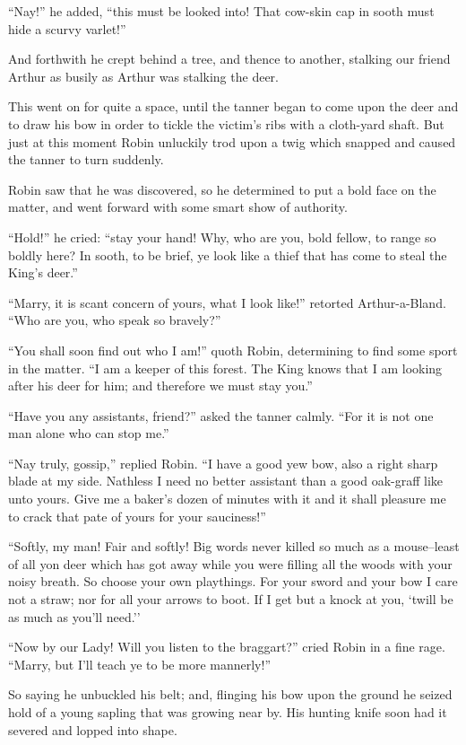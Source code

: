 ``Nay!'' he added, ``this must be looked into! That cow-skin cap in
sooth must hide a scurvy varlet!''

And forthwith he crept behind a tree, and thence to another, stalking
our friend Arthur as busily as Arthur was stalking the deer.

This went on for quite a space, until the tanner began to come upon the
deer and to draw his bow in order to tickle the victim's ribs with a
cloth-yard shaft. But just at this moment Robin unluckily trod upon a
twig which snapped and caused the tanner to turn suddenly.

Robin saw that he was discovered, so he determined to put a bold face on
the matter, and went forward with some smart show of authority.

``Hold!'' he cried: ``stay your hand! Why, who are you, bold fellow, to
range so boldly here? In sooth, to be brief, ye look like a thief that
has come to steal the King's deer.''

``Marry, it is scant concern of yours, what I look like!'' retorted
Arthur-a-Bland. ``Who are you, who speak so bravely?''

``You shall soon find out who I am!'' quoth Robin, determining to find
some sport in the matter. ``I am a keeper of this forest. The King knows
that I am looking after his deer for him; and therefore we must stay
you.''

``Have you any assistants, friend?'' asked the tanner calmly. ``For it
is not one man alone who can stop me.''

``Nay truly, gossip,'' replied Robin. ``I have a good yew bow, also a
right sharp blade at my side. Nathless I need no better assistant than a
good oak-graff like unto yours. Give me a baker's dozen of minutes with
it and it shall pleasure me to crack that pate of yours for your
sauciness!''

``Softly, my man! Fair and softly! Big words never killed so much as a
mouse--least of all yon deer which has got away while you were filling
all the woods with your noisy breath. So choose your own playthings. For
your sword and your bow I care not a straw; nor for all your arrows to
boot. If I get but a knock at you, `twill be as much as you'll need.''

``Now by our Lady! Will you listen to the braggart?'' cried Robin in a
fine rage. ``Marry, but I'll teach ye to be more mannerly!''

So saying he unbuckled his belt; and, flinging his bow upon the ground
he seized hold of a young sapling that was growing near by. His hunting
knife soon had it severed and lopped into shape.

